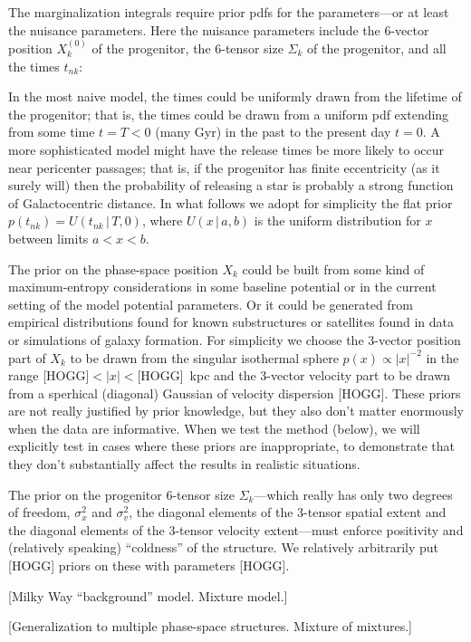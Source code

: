 \documentclass[letterpaper,12pt,preprint]{aastex}
\newcommand{\given}{\,|\,}
\begin{document}
The marginalization integrals require prior pdfs for the
parameters---or at least the nuisance parameters.  Here the nuisance
parameters include the 6-vector position $X_k^{(0)}$ of the
progenitor, the 6-tensor size $\Sigma_k$ of the progenitor, and all
the times $t_{nk}$:

In the most naive model, the times could be uniformly drawn from the
lifetime of the progenitor; that is, the times could be drawn from a
uniform pdf extending from some time $t=T<0$ (many Gyr) in the past to
the present day $t=0$.  A more sophisticated model might have the
release times be more likely to occur near pericenter passages; that
is, if the progenitor has finite eccentricity (as it surely will) then
the probability of releasing a star is probably a strong function of
Galactocentric distance.  In what follows we adopt for simplicity the
flat prior $p(t_{nk})=U(t_{nk}\given T,0)$, where $U(x\given a,b)$ is
the uniform distribution for $x$ between limits $a<x<b$.

The prior on the phase-space position $X_k$ could be built from some
kind of maximum-entropy considerations in some baseline potential or
in the current setting of the model potential parameters.  Or it could
be generated from empirical distributions found for known substructures or
satellites found in data or simulations of galaxy formation.  For
simplicity we choose the 3-vector position part of $X_k$ to be drawn
from the singular isothermal sphere $p(x)\propto |x|^{-2}$ in the
range [HOGG]$<|x|<$[HOGG]~kpc and the 3-vector velocity part to be
drawn from a sperhical (diagonal) Gaussian of velocity dispersion
[HOGG].  These priors are not really justified by prior knowledge, but
they also don't matter enormously when the data are informative.  When
we test the method (below), we will explicitly test in cases where
these priors are inappropriate, to demonstrate that they don't
substantially affect the results in realistic situations.

The prior on the progenitor 6-tensor size $\Sigma_k$---which really
has only two degrees of freedom, $\sigma_x^2$ and $\sigma_v^2$, the
diagonal elements of the 3-tensor spatial extent and the diagonal
elements of the 3-tensor velocity extent---must enforce positivity and
(relatively speaking) ``coldness'' of the structure.  We relatively
arbitrarily put [HOGG] priors on these with parameters [HOGG].

[Milky Way ``background'' model.  Mixture model.]

[Generalization to multiple phase-space structures. Mixture of
  mixtures.]
\end{document}
